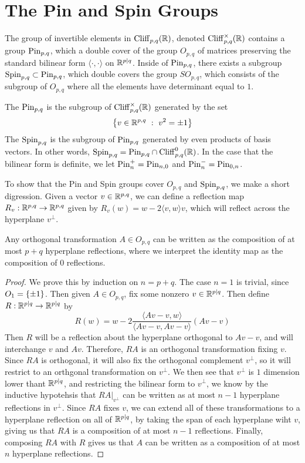 %
\section{The Pin and Spin Groups}
%
The group of invertible elements in $\operatorname{Cliff}_{p,q}(\mathbb{R})$, denoted
$\operatorname{Cliff}_{p,q}^\times(\mathbb{R})$ contains a group $\mathrm{Pin}_{p,q}$, which a double
cover of the group $O_{p,q}$ of matrices preserving the standard bilinear
form $\langle \cdot,\cdot \rangle$ on $\mathbb{R}^{p|q}$. Inside of $\mathrm{Pin}_{p,q}$,
there exists a subgroup $\mathrm{Spin}_{p,q} \subset \mathrm{Pin}_{p,q}$, which double covers
the group $SO_{p,q}$, which consists of the subgroup of $O_{p,q}$ where
all the elements have determinant equal to $1$.
%
\begin{defn}
The  $\mathrm{Pin}_{p,q}$ is the subgroup of $\operatorname{Cliff}_{p,q}^\times(\mathbb{R})$
generated by the set
\[
\left\lbrace v \in \mathbb{R}^{p,q} ~:~ v^2 = \pm 1 \right\rbrace
\]
The  $\mathrm{Spin}_{p,q}$ is the subgroup of $\mathrm{Pin}_{p,q}$ generated by even
products of basis vectors. In other words, $\mathrm{Spin}_{p,q} = \mathrm{Pin}_{p,q} \cap \operatorname{Cliff}_{p,q}^0(\mathbb{R})$. In the case that the bilinear form is definite,
we let $\mathrm{Pin}_n^+ = \mathrm{Pin}_{n,0}$ and $\mathrm{Pin}_n^- = \mathrm{Pin}_{0,n}$.
\end{defn}
%
To show that the Pin and Spin groups cover $O_{p,q}$ and $\mathrm{Spin}_{p,q}$, we make
a short digression. Given a vector $v \in \mathbb{R}^{p,q}$, we can define a reflection
map $R_v : \mathbb{R}^{p,q} \to \mathbb{R}^{p,q}$ given by $R_v(w) = w - 2\langle v,w \rangle v$,
which will reflect across the hyperplane $v^\perp$.
%
\begin{thm}
Any orthogonal transformation $A \in O_{p,q}$ can be written as the composition
of at most $p+q$ hyperplane reflections, where we interpret the identity map as the
composition of $0$ reflections.
\end{thm}
%
\begin{proof}
We prove this by induction on $n = p+q$. The case $n=1$ is trivial, since
$O_1 = \left\lbrace \pm 1 \right\rbrace$. Then given $A \in O_{p,q}$, fix some nonzero $v \in \mathbb{R}^{p|q}$.
Then define $R : \mathbb{R}^{p|q} \to \mathbb{R}^{p|q}$ by
\[
R(w) = w - 2 \frac{\langle Av - v,w \rangle}{\langle Av -v, Av - v\rangle}(Av - v)
\]
Then $R$ will be a reflection about the hyperplane orthogonal to $Av - v$,
and will interchange $v$ and $Av$. Therefore, $RA$ is an orthogonal transformation
fixing $v$. Since $RA$ is orthogonal, it will also fix the orthogonal complement
$v^\perp$, so it will restrict to an orthgonal transformation on $v^\perp$. We
then see that $v^\perp$ is $1$ dimension lower thant $\mathbb{R}^{p|q}$, and restricting
the bilinear form to $v^\perp$, we know by the inductive hypotehsis that
$RA\vert_{v^\perp}$ can be written as at most $n-1$ hyperplane reflections in
$v^\perp$. Since $RA$ fixes $v$, we can extend all of these transformations to
a hyperplane reflection on all of $\mathbb{R}^{p|q}$, by taking the span of each hyperplane
wiht $v$, giving us that $RA$ is a composition of at most $n-1$ reflections. Finally,
composing $RA$ with $R$ gives us that $A$ can be written as a composition of at most
$n$ hyperplane reflections.
\end{proof}
